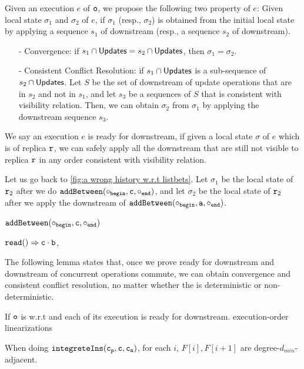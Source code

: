{Given an execution $e$ of $\mathtt{o}$, we propose the following two property of $e$: Given local state $\sigma_1$ and $\sigma_2$ of $e$, if $\sigma_1$ (resp., $\sigma_2$) is obtained from the initial local state by applying a sequence $s_1$ of downstream (resp., a sequence $s_2$ of downstream).

\begin{itemize}
\setlength{\itemsep}{0.5pt}
\item[-] Convergence: if $s_1 \cap \mathsf{Updates} = s_2 \cap \mathsf{Updates}$, then $\sigma_1 = \sigma_2$.

\item[-] Consistent Conflict Resolution: if $s_1 \cap \mathsf{Updates}$ is a sub-sequence of $s_2 \cap \mathsf{Updates}$. Let $S$ be the set of downstream of update operations that are in $s_2$ and not in $s_1$, and let $s_3$ be a sequences of $S$ that is consistent with visibility relation. Then, we can obtain $\sigma_2$ from $\sigma_1$ by applying the downstream sequence $s_3$.
\end{itemize}

We say an execution $e$ is ready for downstream, if given a local state $\sigma$ of $e$ which is of replica $\mathtt{r}$, we can safely apply all the downstream that are still not visible to replica $\mathtt{r}$ in any order consistent with visibility relation.

Let us go back to \autoref{fig:a wrong history w.r.t listbets}. Let $\sigma_1$ be the local state of $\mathtt{r}_2$ after we do $\alabelshort[{\tt addBetween}]{\circ_{begin},c,\circ_{end}}$, and let $\sigma_2$ be the local state of $\mathtt{r}_2$ after we apply the downstream of $\alabelshort[{\tt addBetween}]{\circ_{begin},a,\circ_{end}}$.

$\alabelshort[{\tt addBetween}]{\circ_{begin},c,\circ_{end}}$

$\alabellong[{\tt read}]{}{c \cdot b}{}$,

The following lemma states that, once we prove ready for downstream and downstream of concurrent operations commute, we can obtain convergence and consistent conflict resolution, no matter whether the \Spec{} is deterministic or non-deterministic.

\begin{lemma}
\label{lemma:execution-order linearization ensures convergence and consistent conflict resolution}
If $\mathtt{o}$ is \crdtlinearizable{} w.r.t \Spec{} and each of its execution is ready for downstream.
execution-order linearizations

When doing $\alabelshort[{\tt integreteIns}]{c_p,c,c_n}$, for each $i$, $F[i],F[i+1]$ are degree-$d_{min}$-adjacent.
\end{lemma}

}
